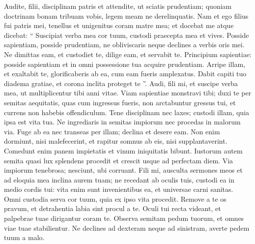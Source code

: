 \begin{biblechapter}
\begin{biblechapter}
\begin{biblechapter}
\begin{biblechapter}
 \verse Audite, filii, disciplinam patris
 et attendite, ut sciatis prudentiam;
 \verse quoniam doctrinam bonam tribuam vobis,
 legem meam ne derelinquatis.
 \verse Nam et ego filius fui patris mei,
 tenellus et unigenitus coram matre mea;
 \verse et docebat me atque dicebat:
 “ Suscipiat verba mea cor tuum,
 custodi praecepta mea et vives.
 \verse Posside sapientiam, posside prudentiam,
 ne obliviscaris neque declines a verbis oris mei.
 \verse Ne dimittas eam, et custodiet te,
 dilige eam, et servabit te.
 \verse Principium sapientiae: posside sapientiam
 et in omni possessione tua acquire prudentiam.
 \verse Arripe illam, et exaltabit te,
 glorificaberis ab ea, cum eam fueris amplexatus.
 \verse Dabit capiti tuo diadema gratiae,
 et corona inclita proteget te ”.
 \verse Audi, fili mi, et suscipe verba mea,
 ut multiplicentur tibi anni vitae.
 \verse Viam sapientiae monstravi tibi;
 duxi te per semitas aequitatis,
 \verse quas cum ingressus fueris, non arctabuntur gressus tui,
 et currens non habebis offendiculum.
 \verse Tene disciplinam nec laxes;
 custodi illam, quia ipsa est vita tua.
 \verse Ne ingrediaris in semitas impiorum
 nec procedas in malorum via.
 \verse Fuge ab ea nec transeas per illam;
 declina et desere eam.
 \verse Non enim dormiunt, nisi malefecerint,
 et rapitur somnus ab eis, nisi supplantaverint.
 \verse Comedunt enim panem impietatis
 et vinum iniquitatis bibunt.
 \verse Iustorum autem semita quasi lux splendens
 procedit et crescit usque ad perfectam diem.
 \verse Via impiorum tenebrosa;
 nesciunt, ubi corruant.
 \verse Fili mi, ausculta sermones meos
 et ad eloquia mea inclina aurem tuam;
 \verse ne recedant ab oculis tuis,
 custodi ea in medio cordis tui:
 \verse vita enim sunt invenientibus ea,
 et universae carni sanitas.
 \verse Omni custodia serva cor tuum,
 quia ex ipso vita procedit.
 \verse Remove a te os pravum,
 et detrahentia labia sint procul a te.
 \verse Oculi tui recta videant,
 et palpebrae tuae dirigantur coram te.
 \verse Observa semitam pedum tuorum,
 et omnes viae tuae stabilientur.
 \verse Ne declines ad dexteram neque ad sinistram,
 averte pedem tuum a malo.
 

\end{biblechapter}
\end{biblechapter}
\end{biblechapter}
\end{biblechapter}
